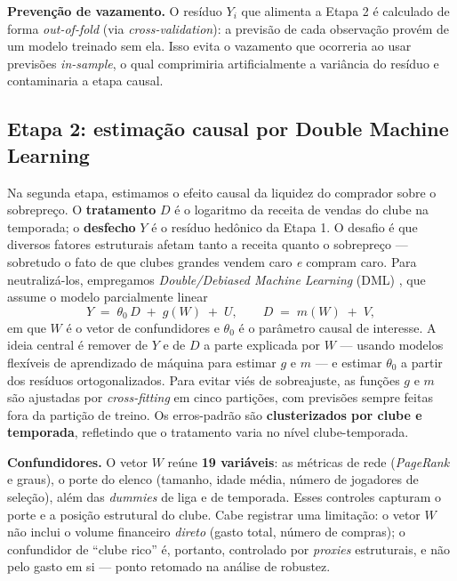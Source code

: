 \textbf{Prevenção de vazamento.} O resíduo $Y_i$ que alimenta a Etapa 2 é calculado de forma
\textit{out-of-fold} (via \textit{cross-validation}): a previsão de cada observação provém de um
modelo treinado sem ela. Isso evita o vazamento que ocorreria ao usar previsões \textit{in-sample},
o qual comprimiria artificialmente a variância do resíduo e contaminaria a etapa causal.

\subsection{Etapa 2: estimação causal por Double Machine Learning}

Na segunda etapa, estimamos o efeito causal da liquidez do comprador sobre o sobrepreço. O
\textbf{tratamento} $D$ é o logaritmo da receita de vendas do clube na temporada; o \textbf{desfecho}
$Y$ é o resíduo hedônico da Etapa 1. O desafio é que diversos fatores estruturais afetam tanto a
receita quanto o sobrepreço — sobretudo o fato de que clubes grandes vendem caro \textit{e} compram
caro. Para neutralizá-los, empregamos \textit{Double/Debiased Machine Learning} (DML)
\cite{chernozhukov2018}, que assume o modelo parcialmente linear
%
\begin{equation}
Y \;=\; \theta_0\, D \;+\; g(W) \;+\; U, \qquad D \;=\; m(W) \;+\; V,
\label{eq:dml}
\end{equation}
%
em que $W$ é o vetor de confundidores e $\theta_0$ é o parâmetro causal de interesse. A ideia central
é remover de $Y$ e de $D$ a parte explicada por $W$ — usando modelos flexíveis de aprendizado de
máquina para estimar $g$ e $m$ — e estimar $\theta_0$ a partir dos resíduos ortogonalizados. Para
evitar viés de sobreajuste, as funções $g$ e $m$ são ajustadas por \textit{cross-fitting} em cinco
partições, com previsões sempre feitas fora da partição de treino. Os erros-padrão são
\textbf{clusterizados por clube e temporada}, refletindo que o tratamento varia no nível
clube-temporada.

\textbf{Confundidores.} O vetor $W$ reúne \textbf{19 variáveis}: as métricas de rede (\textit{PageRank}
e graus), o porte do elenco (tamanho, idade média, número de jogadores de seleção), além das
\textit{dummies} de liga e de temporada. Esses controles capturam o porte e a posição estrutural do
clube. Cabe registrar uma limitação: o vetor $W$ não inclui o volume financeiro \textit{direto}
(gasto total, número de compras); o confundidor de ``clube rico'' é, portanto, controlado por
\textit{proxies} estruturais, e não pelo gasto em si — ponto retomado na análise de robustez.

